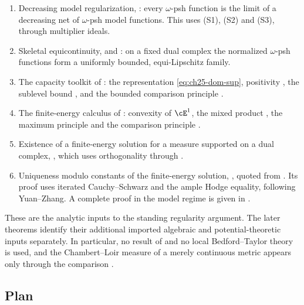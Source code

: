 \begin{enumerate}
\item\label{itm:ch29-import:reg}
 Decreasing model regularization,
 : every $\omega$-psh function is
 the limit of a decreasing net of $\omega$-psh model functions.  This uses
 \textup{(S1)}, \textup{(S2)} and \textup{(S3)}, through multiplier ideals.
\item\label{itm:ch29-import:equi}
 Skeletal equicontinuity,  and
 : on a fixed dual complex the normalized
 $\omega$-psh functions form a uniformly bounded, equi-Lipschitz family.
\item\label{itm:ch29-import:cap}
 The capacity toolkit of : the representation
 \eqref{eq:ch25-dom-sup}, positivity
 , the sublevel bound
 , and the bounded comparison principle
 .
\item\label{itm:ch29-import:e1}
 The finite-energy calculus of : convexity of
 $\cE^1$, the mixed product , the maximum
 principle  and the comparison
 principle .
\item\label{itm:ch29-import:var}
 Existence of a finite-energy solution for a measure supported on a dual
 complex, , which uses orthogonality through
 .
\item\label{itm:ch29-import:uniq}
 Uniqueness modulo constants of the finite-energy solution,
 , quoted from
 \cite[Proposition~8.2]{BFJ15}.  Its proof uses iterated
 Cauchy--Schwarz and the ample Hodge equality, following Yuan--Zhang.  A complete proof in the model
 regime is given in .
\end{enumerate}

These are the analytic inputs to the standing regularity argument.
The later theorems identify their additional imported algebraic and
potential-theoretic inputs separately.  In particular, no result of
 and no local Bedford--Taylor theory is used,
and the Chambert--Loir measure of a merely continuous metric appears only
through the comparison .

\subsection{Plan}
\label{sec:ch29-plan}

